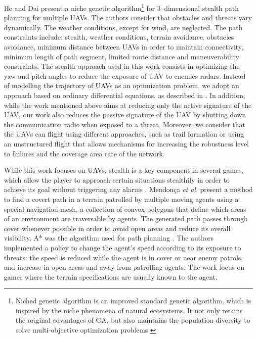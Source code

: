 He and Dai \cite{he_2013} present a niche genetic algorithm\footnote{Niched genetic algorithm is an improved standard genetic algorithm, which is inspired by the niche phenomena of natural ecosystems. It not only retains the original advantages of GA, but also maintains the population diversity to solve multi-objective optimization problems \cite{zhou_1999}} for 3--dimensional stealth path planning for multiple UAVs. The authors consider that obstacles and threats vary dynamically. The weather conditions, except for wind, are neglected. The path constraints include: stealth, weather conditions, terrain avoidance, obstacles avoidance, minimum distance between UAVs in order to maintain connectivity, minimum length of path segment, limited route distance and maneuverability constraints. The stealth approach used in this work consists in optimizing the yaw and pitch angles to reduce the exposure of UAV to enemies radars. Instead of modelling the trajectory of UAVs as an optimization problem, we adopt an approach based on ordinary differential equations, as described in \cite{ghedini_2016_dars}. In addition, while the work mentioned above aims at reducing only the active signature of the UAV, our work also reduces the passive signature of the UAV by shutting down the communication radio when exposed to a threat. Moreover, we consider that the UAVs can flight using different approaches, such as trail formation or using an unstructured flight that allows mechanisms for increasing the robustness level to failures and the coverage area rate of the network.

While this work focuses on UAVs, stealth is a key component in several games, which allow the player to approach certain situations stealthily in order to achieve its goal without triggering any alarms \cite{mendonca_2015}. Mendon\c{c}a \textit{et al.} \cite{mendonca_2015} present a method to find a covert path in a terrain patrolled by multiple moving agents using a special navigation mesh, a collection of convex polygons that define which areas of an environment are traversable by agents. The generated path passes through cover whenever possible in order to avoid open areas and reduce its overall visibility. A* was the algorithm used for path planning \cite{hart_1968}. The authors implemented a policy to change the agent's speed according to its exposure to threats: the speed is reduced while the agent is in cover or near enemy patrols, and increase in open areas and away from patrolling agents. The work focus on  games where the terrain specifications are usually known to the agent.

